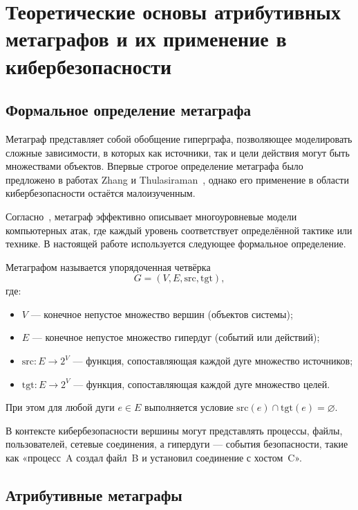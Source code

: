 
\chapter{Теоретические основы атрибутивных метаграфов и их применение в кибербезопасности}

\section{Формальное определение метаграфа}

Метаграф представляет собой обобщение гиперграфа, позволяющее моделировать сложные зависимости, в которых как источники, так и цели действия могут быть множествами объектов. Впервые строгое определение метаграфа было предложено в работах Zhang и Thulasiraman~\cite{Zhang2006}, однако его применение в области кибербезопасности остаётся малоизученным.

Согласно~\cite{Latypov2020}, метаграф эффективно описывает многоуровневые модели компьютерных атак, где каждый уровень соответствует определённой тактике или технике. В настоящей работе используется следующее формальное определение.

\begin{definition}
Метаграфом называется упорядоченная четвёрка
\[
G = (V, E, \mathrm{src}, \mathrm{tgt}),
\]
где:
\begin{itemize} 
    \item $V$ — конечное непустое множество вершин (объектов системы);
    \item $E$ — конечное непустое множество гипердуг (событий или действий);
    \item $\mathrm{src}: E \rightarrow 2^V$ — функция, сопоставляющая каждой дуге множество источников;
    \item $\mathrm{tgt}: E \rightarrow 2^V$ — функция, сопоставляющая каждой дуге множество целей.
\end{itemize}   
    При этом для любой дуги $e \in E$ выполняется условие $\mathrm{src}(e) \cap \mathrm{tgt}(e) = \varnothing$.
\end{definition}

В контексте кибербезопасности вершины могут представлять процессы, файлы, пользователей, сетевые соединения, а гипердуги — события безопасности, такие как «процесс~A создал файл~B и установил соединение с хостом~C».

\section{Атрибутивные метаграфы}

